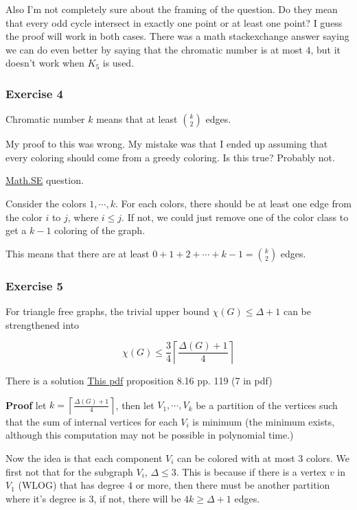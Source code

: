 \documentclass[11pt]{article}
\begin{document}
Also I'm not completely sure about the framing of the question. Do they mean
that every odd cycle intersect in exactly one point or at least one point? I
guess the proof will work in both cases. There was a math stackexchange
answer saying we can do even better by saying that the chromatic number is
at most \(4\), but it doesn't work when \(K_5\) is used.
\subsubsection{Exercise 4}
\label{sec:org8fffd80}
Chromatic number \(k\) means that at least \({k \choose 2}\) edges.

My proof to this was wrong. My mistake was that I ended up assuming that
every coloring should come from a greedy coloring. Is this true? Probably
not.

\href{https://math.stackexchange.com/questions/1135688/prove-that-every-k-chromatic-graph-has-size-m-geq-binom-k2}{Math.SE} question.

Consider the colors \(1, \cdots, k\). For each colors, there should be at
least one edge from the color \(i\) to \(j\), where \(i \le j\). If not, we could
just remove one of the color class to get a \(k-1\) coloring of the graph.

This means that there are at least \(0 + 1 + 2 + \cdots + k - 1 =
    \binom{k}{2}\) edges.
\subsubsection{Exercise 5}
\label{sec:org8f2f37b}
For triangle free graphs, the trivial upper bound \(\chi(G) \le \Delta + 1\)
can be strengthened into

$$\chi(G) \le \frac{3}{4} \left\lceil \frac{\Delta(G) + 1}{4}\right\rceil$$

There is a solution \href{http://www-sop.inria.fr/members/Frederic.Havet/Cours/coloration.pdf}{This pdf} proposition 8.16 pp. 119 (7 in pdf)

\textbf{Proof} let \(k = \left\lceil \frac{\Delta(G) + 1}{4}\right\rceil\), then let
 \(V_1, \cdots, V_k\) be a partition of the vertices such that the sum of
 internal vertices for each \(V_i\) is minimum (the minimum exists, although
 this computation may not be possible in polynomial time.)

Now the idea is that each component \(V_i\) can be colored with at most \(3\)
colors. We first not that for the subgraph \(V_i\), \(\Delta \le 3\). This is
because if there is a vertex \(v\) in \(V_1\) (WLOG) that has degree \(4\) or
more, then there must be another partition where it's degree is \(3\), if
not, there will be \(4k \ge \Delta + 1\) edges.
\end{document}

